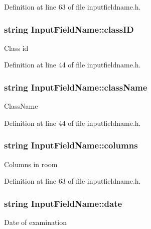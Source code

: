 \-Definition at line 63 of file inputfieldname.\-h.

\hypertarget{classInputFieldName_a6a67c361f3b631fb6c3620c14a615fb9}{
\subsubsection[{class\-I\-D}]{\setlength{\rightskip}{0pt plus 5cm}string {\bf \-Input\-Field\-Name\-::class\-I\-D}}}\label{dd/db2/classInputFieldName_a6a67c361f3b631fb6c3620c14a615fb9}
\-Class id 

\-Definition at line 44 of file inputfieldname.\-h.

\hypertarget{classInputFieldName_ad8b28ebeabdabb5967542e317f549280}{
\subsubsection[{class\-Name}]{\setlength{\rightskip}{0pt plus 5cm}string {\bf \-Input\-Field\-Name\-::class\-Name}}}\label{dd/db2/classInputFieldName_ad8b28ebeabdabb5967542e317f549280}
\-Class\-Name 

\-Definition at line 44 of file inputfieldname.\-h.

\hypertarget{classInputFieldName_abca049f347e589f24b672c19907c5c72}{
\subsubsection[{columns}]{\setlength{\rightskip}{0pt plus 5cm}string {\bf \-Input\-Field\-Name\-::columns}}}\label{dd/db2/classInputFieldName_abca049f347e589f24b672c19907c5c72}
\-Columns in room 

\-Definition at line 63 of file inputfieldname.\-h.

\hypertarget{classInputFieldName_afb053a44abe76e108533e23902e90321}{
\subsubsection[{date}]{\setlength{\rightskip}{0pt plus 5cm}string {\bf \-Input\-Field\-Name\-::date}}}\label{dd/db2/classInputFieldName_afb053a44abe76e108533e23902e90321}
\-Date of examination 


